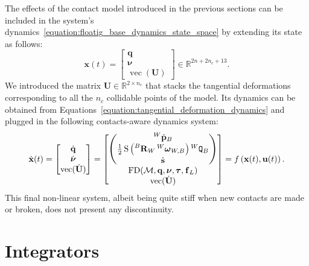 The effects of the contact model introduced in the previous sections can be included in the system's dynamics~\eqref{equation:floatig_base_dynamics_state_space} by extending its state as follows:
%
\begin{equation*}
    \mathbf{x}(t) =
    \begin{bmatrix}
        \mathbf{q} \\ \boldsymbol{\nu} \\ \operatorname{vec}(\mathbf{U})
    \end{bmatrix}
    \in \mathbb{R}^{2n+2n_c+13}
    .
\end{equation*}
%
We introduced the matrix $\mathbf{U} \in \mathbb{R}^{2 \times n_c}$ that stacks the tangential deformations corresponding to all the $n_c$ collidable points of the model.
Its dynamics can be obtained from Equations~\eqref{equation:tangential_deformation_dynamics} and plugged in the following contacts-aware dynamics system:
%
\begin{equation}
\label{equation:floatig_base_dynamics_with_contacts_state_space}
    \dot{\mathbf{x}}(t) =
    \begin{bmatrix}
        \dot{\mathbf{q}} \\ \dot{\boldsymbol{\nu}} \\ \operatorname{vec}(\dot{\mathbf{U}})
    \end{bmatrix} =
    \begin{bmatrix}
        \begin{pmatrix}
            \posd[W]_B \\
            \frac{1}{2} \operatorname{S}\left( \rot[B]_W \velang[W]_{W,B} \right) \quat[W]_B \\
            \dot{\mathbf{s}}
        \end{pmatrix} \\
        \operatorname{FD}(\mathcal{M}, \mathbf{q}, \boldsymbol{\nu}, \boldsymbol{\tau}, \forcesix_L) \\
        \operatorname{vec}(\dot{\mathbf{U}})
    \end{bmatrix} =
    f\left(\mathbf{x}(t), \mathbf{u}(t)\right)
    .
\end{equation}
%
This final non-linear system, albeit being quite stiff when new contacts are made or broken, does not present any discontinuity.

\section{Integrators}
\label{sec:integrators}

